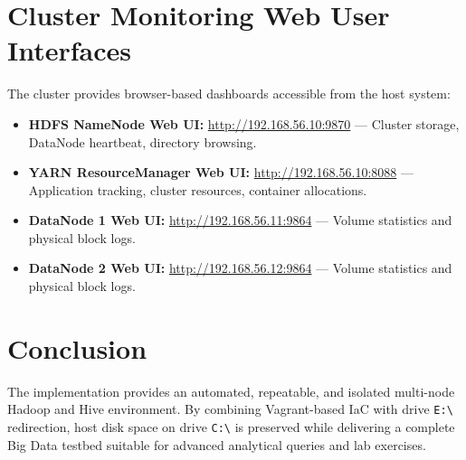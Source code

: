 \documentclass[11pt,a4paper]{article}
\begin{document}
\section{Cluster Monitoring Web User Interfaces}
The cluster provides browser-based dashboards accessible from the host system:
\begin{itemize}
    \item \textbf{HDFS NameNode Web UI:} \url{http://192.168.56.10:9870} --- Cluster storage, DataNode heartbeat, directory browsing.
    \item \textbf{YARN ResourceManager Web UI:} \url{http://192.168.56.10:8088} --- Application tracking, cluster resources, container allocations.
    \item \textbf{DataNode 1 Web UI:} \url{http://192.168.56.11:9864} --- Volume statistics and physical block logs.
    \item \textbf{DataNode 2 Web UI:} \url{http://192.168.56.12:9864} --- Volume statistics and physical block logs.
\end{itemize}

\section{Conclusion}
The implementation provides an automated, repeatable, and isolated multi-node Hadoop and Hive environment. By combining Vagrant-based IaC with drive \texttt{E:\textbackslash} redirection, host disk space on drive \texttt{C:\textbackslash} is preserved while delivering a complete Big Data testbed suitable for advanced analytical queries and lab exercises.
\end{document}
